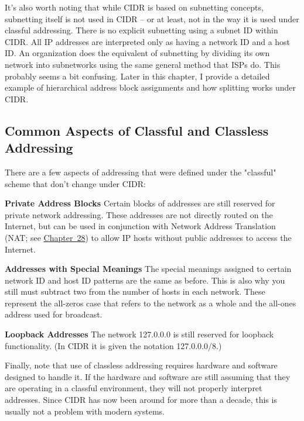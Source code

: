 \documentclass[b5paper,11pt]{memoir}
\begin{document}
It's also worth noting that while CIDR is based on subnetting concepts,
subnetting itself is not used in CIDR -- or at least, not in the way it
is used under classful addressing. There is no explicit subnetting using
a subnet ID within CIDR. All IP addresses are interpreted only as having
a network ID and a host ID. An organization does the equivalent of
subnetting by dividing its own network into subnetworks using the same
general method that ISPs do. This probably seems a bit confusing. Later
in this chapter, I provide a detailed example of hierarchical address
block assignments and how splitting works under CIDR.

\subsection[Common Aspects of Classful and Classless
Addressing]{\texorpdfstring{\protect\hypertarget{ch20s02.htmlux5cux23common_aspects_of_classful_and_classless}{}{}Common
Aspects of Classful and Classless
Addressing}{Common Aspects of Classful and Classless Addressing}}

There are a few aspects of addressing that were defined under the
"classful" scheme that don't change under CIDR:

{\textbf{Private Address Blocks}} Certain blocks of addresses are still
reserved for private network addressing. These addresses are not
directly routed on the Internet, but can be used in conjunction with
Network Address Translation (NAT; see
\protect\hyperlink{ch28.html}{Chapter~28}) to allow IP hosts without
public addresses to access the Internet.

{\textbf{Addresses with Special Meanings}} The special meanings assigned
to certain network ID and host ID patterns are the same as before. This
is also why you still must subtract two from the number of hosts in each
network. These represent the all-zeros case that refers to the network
as a whole and the all-ones address used for broadcast.

{\textbf{Loopback Addresses}} The network 127.0.0.0 is still reserved
for loopback functionality. (In CIDR it is given the notation
127.0.0.0/8.)

Finally, note that use of classless addressing requires hardware and
software designed to handle it. If the hardware and software are still
assuming that they are operating in a classful environment, they will
not properly interpret addresses. Since CIDR has now been around for
more than a decade, this is usually not a problem with modern systems.
\end{document}
